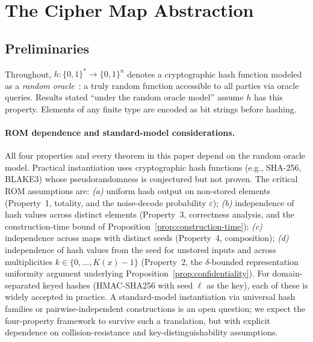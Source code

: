 \documentclass[11pt]{article}
\theoremstyle{definition}
\theoremstyle{plain}
\theoremstyle{remark}
\begin{document}
\section{The Cipher Map Abstraction}
\label{sec:abstraction}

\subsection{Preliminaries}

Throughout, $h : \{0,1\}^* \to \{0,1\}^n$ denotes a cryptographic hash
function modeled as a \emph{random oracle}~\cite{bellare1993random}: a
truly random function accessible to all parties via oracle queries.
Results stated ``under the random oracle model'' assume $h$ has this
property.  Elements of any finite type are encoded as bit strings before
hashing.

\paragraph{ROM dependence and standard-model considerations.}
All four properties and every theorem in this paper depend on the random
oracle model.  Practical instantiation uses cryptographic hash functions
(e.g., SHA-256, BLAKE3) whose pseudorandomness is conjectured but not
proven.  The critical ROM assumptions are:
\emph{(a)} uniform hash output on non-stored elements (Property~1,
totality, and the noise-decode probability $\varepsilon$);
\emph{(b)} independence of hash values across distinct elements
(Property~3, correctness analysis, and the construction-time bound of
Proposition~\ref{prop:construction-time});
\emph{(c)} independence across maps with distinct seeds
(Property~4, composition);
\emph{(d)} independence of hash values from the seed for unstored
inputs and across multiplicities $k \in \{0, \ldots, K(x)-1\}$
(Property~2, the $\delta$-bounded representation uniformity argument
underlying Proposition~\ref{prop:confidentiality}).
For domain-separated keyed hashes (HMAC-SHA256 with seed $\ell$ as the key),
each of these is widely accepted in practice.
A standard-model instantiation via universal hash families or pairwise-independent
constructions is an open question; we expect the four-property framework to
survive such a translation, but with explicit dependence on collision-resistance
and key-distinguishability assumptions.
\end{document}
